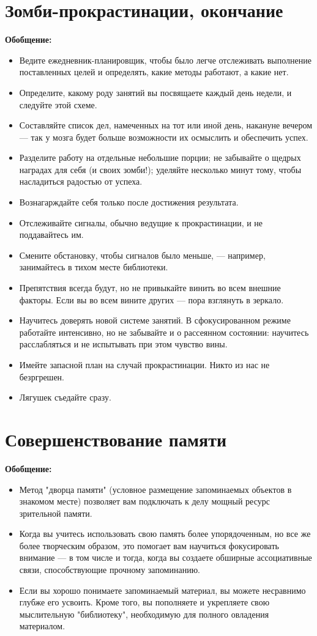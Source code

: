 \documentclass{article}
\begin{document}
\section{Зомби-прокрастинации, окончание}
\textbf{Обобщение:}
\begin{itemize}
\item Ведите ежедневник-планировщик, чтобы было легче отслеживать выполнение поставленных целей и определять, какие методы работают, а какие нет.
\item Определите, какому роду занятий вы посвящаете каждый день недели, и следуйте этой схеме.
\item Составляйте список дел, намеченных на тот или иной день, накануне вечером --- так у мозга будет больше возможности их осмыслить и обеспечить успех.
\item Разделите работу на отдельные небольшие порции; не забывайте о щедрых наградах для себя (и своих зомби!); уделяйте несколько минут тому, чтобы насладиться радостью от успеха.
\item Вознагарждайте себя только после достижения результата.
\item Отслеживайте сигналы, обычно ведущие к прокрастинации, и не поддавайтесь им.
\item Смените обстановку, чтобы сигналов было меньше, --- например, занимайтесь в тихом месте библиотеки.
\item Препятствия всегда будут, но не привыкайте винить во всем внешние факторы. Если вы во всем вините других --- пора взглянуть в зеркало.
\item Научитесь доверять новой системе занятий. В сфокусированном режиме работайте интенсивно, но не забывайте и о рассеянном состоянии: научитесь расслабляться и не испытывать при этом чувство вины.
\item Имейте запасной план на случай прокрастинации. Никто из нас не безргрешен.
\item Лягушек съедайте сразу.
\end{itemize}

\section{Совершенствование памяти}
\textbf{Обобщение:}
\begin{itemize}
\item Метод "дворца памяти" (условное размещение запоминаемых объектов в знакомом месте) позволяет вам подключать к делу мощный ресурс зрительной памяти.
\item Когда вы учитесь использовать свою память более упорядоченным, но все же более творческим образом, это помогает вам научиться фокусировать внимание --- в том числе и тогда, когда вы создаете обширные ассоциативные связи, способствующие прочному запоминанию.
\item Если вы хорошо понимаете запоминаемый материал, вы можете несравнимо глубже его усвоить. Кроме того, вы пополняете и укрепляете свою мыслительную "библиотеку", необходимую для полного овладения материалом.
\end{itemize}
\end{document}
